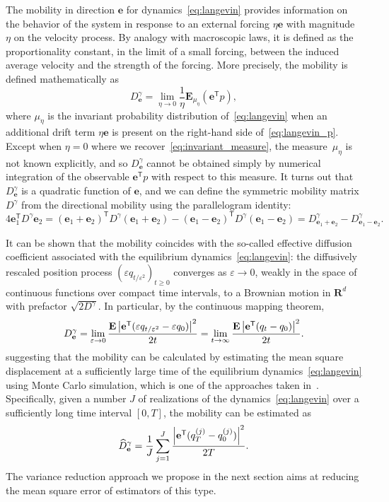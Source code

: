 \documentclass[11pt,a4paper]{article}
\newcommand{\expect}[0]{\mathbf{E}}
\newcommand{\real}{\mathbf R}
\newcommand{\vect}[1]{\boldsymbol{\mathbf #1}}
\renewcommand{\t}{\mathsf T}
\theoremstyle{plain}
\numberwithin{equation}{section}
\renewcommand{\geq}{\geqslant}
\begin{document}
The mobility in direction $\vect e$ for dynamics~\eqref{eq:langevin} provides information on the behavior of the system
in response to an external forcing $\eta \vect e$ with magnitude~$\eta$ on the velocity process.
By analogy with macroscopic laws,
it is defined as the proportionality constant,
in the limit of a small forcing,
between the induced average velocity and the strength  of the forcing.
More precisely,
the mobility is defined mathematically as
\[
    D^{\gamma}_{\vect e} = \lim_{\eta \to 0} \frac{1}{\eta}\expect_{\mu_{\eta}} (\vect e^\t p),
\]
where $\mu_{\eta}$ is the invariant probability distribution of~\eqref{eq:langevin} when
an additional drift term $\eta \vect e$ is present on the right-hand side of~\eqref{eq:langevin_p}.
Except when $\eta = 0$ where we recover~\eqref{eq:invariant_measure},
the measure~$\mu_{\eta}$ is not known explicitly,
and so $D_{\vect e}^{\gamma}$ cannot be obtained simply by numerical integration of the observable $\vect e^\t p$ with respect to this measure.
It turns out that $D_{\vect e}^{\gamma}$ is a quadratic function of $\vect e$,
and we can define the symmetric mobility matrix $D^{\gamma}$ from the directional mobility
using the parallelogram identity:
\[
    4 \vect e_1^\t D^{\gamma} \vect e_2
    = (\vect e_1 + \vect e_2) ^\t D^{\gamma} (\vect e_1 + \vect e_2)
    - (\vect e_1 - \vect e_2) ^\t D^{\gamma} (\vect e_1 - \vect e_2)
    = D^{\gamma}_{\vect e_1 + \vect e_2} - D^{\gamma}_{\vect e_1 - \vect e_2}.
\]

It can be shown that the mobility coincides with the so-called effective diffusion coefficient associated with the equilibrium dynamics~\eqref{eq:langevin}:
the diffusively rescaled position process $(\varepsilon q_{t/\varepsilon^2})_{t\geq0}$ converges as $\varepsilon \to 0$,
weakly in the space of continuous functions over compact time intervals,
to a Brownian motion in $\real^d$ with prefactor $\sqrt{2 D^{\gamma}}$.
In particular, by the continuous mapping theorem,
\begin{equation}
    \label{eq:einsteins_formula}
    D^{\gamma}_{\vect e}
    =\lim_{\varepsilon \to 0} \frac{\expect\abs{\vect e^\t (\varepsilon q_{t/\varepsilon^2} - \varepsilon q_0)}^2}{2 t}
    =\lim_{t \to \infty} \frac{\expect \abs{\vect e^\t (q_t - q_0)}^2}{2t}.
\end{equation}
suggesting that the mobility can be calculated by
estimating the mean square displacement at a sufficiently large time of the equilibrium dynamics~\eqref{eq:langevin}
using Monte Carlo simulation,
which is one of the approaches taken in~\cite{MR2427108}.
Specifically, given a number $J$ of realizations of the dynamics~\eqref{eq:langevin} over a sufficiently long time interval $[0, T]$,
the mobility can be estimated as
\begin{equation}
    \label{eq:naive_estimator}
    \widehat D^{\gamma}_{\vect e}
    = \frac{1}{J} \sum_{j=1}^{J} \frac{\abs{\vect e^\t (q^{(j)}_T - q^{(j)}_0)}^2}{2T}.
\end{equation}
The variance reduction approach we propose in the next section aims at reducing the mean square error of estimators of this type.
\end{document}
